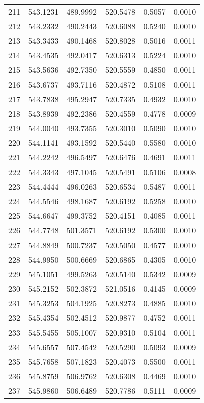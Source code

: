 \documentclass{article}
\begin{document}
\begin{longtable}{|c|c|c|c|c|c|}
211 & 543.1231 & 489.9992 & 520.5478 & 0.5057 & 0.0010 \\
212 & 543.2332 & 490.2443 & 520.6088 & 0.5240 & 0.0010 \\
213 & 543.3433 & 490.1468 & 520.8028 & 0.5016 & 0.0011 \\
214 & 543.4535 & 492.0417 & 520.6313 & 0.5224 & 0.0010 \\
215 & 543.5636 & 492.7350 & 520.5559 & 0.4850 & 0.0011 \\
216 & 543.6737 & 493.7116 & 520.4872 & 0.5108 & 0.0011 \\
217 & 543.7838 & 495.2947 & 520.7335 & 0.4932 & 0.0010 \\
218 & 543.8939 & 492.2386 & 520.4559 & 0.4778 & 0.0009 \\
219 & 544.0040 & 493.7355 & 520.3010 & 0.5090 & 0.0010 \\
220 & 544.1141 & 493.1592 & 520.5440 & 0.5580 & 0.0010 \\
221 & 544.2242 & 496.5497 & 520.6476 & 0.4691 & 0.0011 \\
222 & 544.3343 & 497.1045 & 520.5491 & 0.5106 & 0.0008 \\
223 & 544.4444 & 496.0263 & 520.6534 & 0.5487 & 0.0011 \\
224 & 544.5546 & 498.1687 & 520.6192 & 0.5258 & 0.0010 \\
225 & 544.6647 & 499.3752 & 520.4151 & 0.4085 & 0.0011 \\
226 & 544.7748 & 501.3571 & 520.6192 & 0.5300 & 0.0010 \\
227 & 544.8849 & 500.7237 & 520.5050 & 0.4577 & 0.0010 \\
228 & 544.9950 & 500.6669 & 520.6865 & 0.4305 & 0.0010 \\
229 & 545.1051 & 499.5263 & 520.5140 & 0.5342 & 0.0009 \\
230 & 545.2152 & 502.3872 & 521.0516 & 0.4145 & 0.0009 \\
231 & 545.3253 & 504.1925 & 520.8273 & 0.4885 & 0.0010 \\
232 & 545.4354 & 502.4512 & 520.9877 & 0.4752 & 0.0011 \\
233 & 545.5455 & 505.1007 & 520.9310 & 0.5104 & 0.0011 \\
234 & 545.6557 & 507.4542 & 520.5290 & 0.5093 & 0.0009 \\
235 & 545.7658 & 507.1823 & 520.4073 & 0.5500 & 0.0011 \\
236 & 545.8759 & 506.9762 & 520.6308 & 0.4469 & 0.0010 \\
237 & 545.9860 & 506.6489 & 520.7786 & 0.5111 & 0.0009 \\

\end{longtable}
\end{document}
